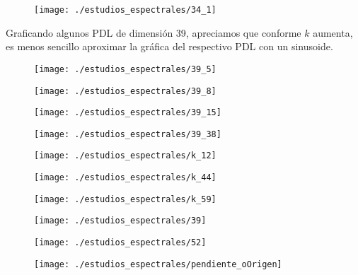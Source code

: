 \begin{figure}[H]
	\sidecaption{
	}
	\centering
	\texttt{[image: ./estudios\_espectrales/34\_1]} 
\end{figure}	

Graficando algunos PDL de dimensión
39, apreciamos que conforme $k$ aumenta, es menos
sencillo aproximar la gráfica del respectivo PDL
con un sinusoide.
\begin{figure}[H]
	\sidecaption{
	}
	\centering
	\texttt{[image: ./estudios\_espectrales/39\_5]} 
\end{figure}	
\begin{figure}[H]
	\sidecaption{
	}
	\centering
	\texttt{[image: ./estudios\_espectrales/39\_8]} 
\end{figure}	
\begin{figure}[H]
	\sidecaption{
	}
	\centering
	\texttt{[image: ./estudios\_espectrales/39\_15]} 
\end{figure}	
\begin{figure}[H]
	\sidecaption{
	}
	\centering
	\texttt{[image: ./estudios\_espectrales/39\_38]} 
\end{figure}	
\begin{figure}[H]
	\sidecaption{
	}
	\centering
	\texttt{[image: ./estudios\_espectrales/k\_12]} 
\end{figure}	
\begin{figure}[H]
	\sidecaption{
	}
	\centering
	\texttt{[image: ./estudios\_espectrales/k\_44]} 
\end{figure}	
\begin{figure}[H]
	\sidecaption{
	}
	\centering
	\texttt{[image: ./estudios\_espectrales/k\_59]} 
\end{figure}	


\begin{figure}[H]
	\sidecaption{
	\label{fig: 30}
	}
	\centering
	\texttt{[image: ./estudios\_espectrales/39]} 
\end{figure}	

\begin{figure}[H]
	\sidecaption{
	\label{fig: 65}
	}
	\centering
	\texttt{[image: ./estudios\_espectrales/52]} 
\end{figure}	

\begin{figure}[H]
	\centering
	\texttt{[image: ./estudios\_espectrales/pendiente\_oOrigen]} 
\end{figure}	

